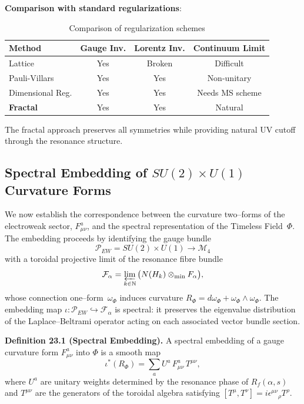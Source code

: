 \begin{level3}
\textbf{Comparison with standard regularizations}:

\begin{table}[h]
\centering
\begin{tabular}{lccc}
\toprule
\textbf{Method} & \textbf{Gauge Inv.} & \textbf{Lorentz Inv.} & \textbf{Continuum Limit} \\
\midrule
Lattice & Yes & Broken & Difficult \\
Pauli-Villars & Yes & Yes & Non-unitary \\
Dimensional Reg. & Yes & Yes & Needs MS scheme \\
\textbf{Fractal} & Yes & Yes & Natural \\
\bottomrule
\end{tabular}
\caption{Comparison of regularization schemes}
\end{table}

The fractal approach preserves all symmetries while providing natural UV cutoff through the resonance structure.
\end{level3}

\subsection{Spectral Embedding of $SU(2)\times U(1)$ Curvature Forms}
\label{sec:spectral_embedding}

We now establish the correspondence between the curvature two--forms of the
electroweak sector, $F^{a}_{\mu\nu}$, and the spectral representation of the
Timeless Field~$\Phi$.
The embedding proceeds by identifying the gauge bundle
\[
\mathcal{P}_{EW}=SU(2)\times U(1)\longrightarrow \mathcal{M}_4
\]
with a toroidal projective limit of the resonance fibre bundle
\[
\mathcal{F}_{\alpha}=\varprojlim_{k\in\mathbb{N}} \big(N(H_k)\otimes_{\min}F_\alpha\big),
\]
whose connection one--form~$\omega_\Phi$ induces curvature
$R_\Phi=d\omega_\Phi+\omega_\Phi\wedge\omega_\Phi$.
The embedding map $\iota: \mathcal{P}_{EW}\hookrightarrow\mathcal{F}_\alpha$
is spectral: it preserves the eigenvalue distribution of the Laplace--Beltrami
operator acting on each associated vector bundle section.

\vspace{0.5em}
\noindent\textbf{Definition 23.1 (Spectral Embedding).}
A spectral embedding of a gauge curvature form
$F^{a}_{\mu\nu}$ into $\Phi$ is a smooth map
\[
\iota^{*}(R_\Phi)=
\sum_{a}U^{a}\,F^{a}_{\mu\nu}\,T^{\mu\nu},
\]
where $U^{a}$ are unitary weights determined by the
resonance phase of $R_f(\alpha,s)$ and
$T^{\mu\nu}$ are the generators of the toroidal algebra
satisfying $[T^{\mu},T^{\nu}]=i\epsilon^{\mu\nu}{}_{\rho}T^{\rho}$.

